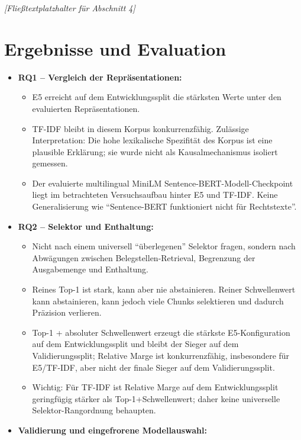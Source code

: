 \documentclass[11pt]{article}
\begin{document}
\textit{[Fließtextplatzhalter für Abschnitt 4]}


\section{Ergebnisse und Evaluation}

\begin{leitfragenbox}
\begin{itemize}
    \item \textbf{RQ1 -- Vergleich der Repräsentationen:}
    \begin{itemize}
        \item E5 erreicht auf dem Entwicklungssplit die st\"arksten Werte unter den evaluierten Repr\"asentationen.
        \item TF-IDF bleibt in diesem Korpus konkurrenzf\"ahig. Zul\"assige Interpretation: Die hohe lexikalische Spezifit\"at des Korpus ist eine plausible Erkl\"arung; sie wurde nicht als Kausalmechanismus isoliert gemessen.
        \item Der evaluierte multilingual MiniLM Sentence-BERT-Modell-Checkpoint liegt im betrachteten Versuchsaufbau hinter E5 und TF-IDF. Keine Generalisierung wie ``Sentence-BERT funktioniert nicht f\"ur Rechtstexte''.
    \end{itemize}
    \item \textbf{RQ2 -- Selektor und Enthaltung:}
    \begin{itemize}
        \item Nicht nach einem universell ``\"uberlegenen'' Selektor fragen, sondern nach Abwägungen zwischen Belegstellen-Retrieval, Begrenzung der Ausgabemenge und Enthaltung.
        \item Reines Top-1 ist stark, kann aber nie abstainieren. Reiner Schwellenwert kann abstainieren, kann jedoch viele Chunks selektieren und dadurch Präzision verlieren.
        \item Top-1 + absoluter Schwellenwert erzeugt die st\"arkste E5-Konfiguration auf dem Entwicklungssplit und bleibt der Sieger auf dem Validierungssplit; Relative Marge ist konkurrenzf\"ahig, insbesondere f\"ur E5/TF-IDF, aber nicht der finale Sieger auf dem Validierungssplit.
        \item Wichtig: F\"ur TF-IDF ist Relative Marge auf dem Entwicklungssplit geringf\"ugig st\"arker als Top-1+Schwellenwert; daher keine universelle Selektor-Rangordnung behaupten.
    \end{itemize}
    \item \textbf{Validierung und eingefrorene Modellauswahl:}

\end{itemize}
\end{leitfragenbox}
\end{document}
